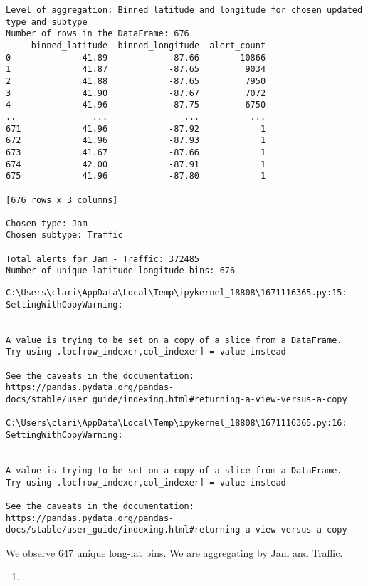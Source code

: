 \documentclass[
  letterpaper,
  DIV=11,
  numbers=noendperiod]{scrartcl}
\providecommand{\tightlist}{%
  \setlength{\itemsep}{0pt}\setlength{\parskip}{0pt}}\usepackage{longtable,booktabs,array}
\begin{document}
\begin{verbatim}
Level of aggregation: Binned latitude and longitude for chosen updated type and subtype
Number of rows in the DataFrame: 676
     binned_latitude  binned_longitude  alert_count
0              41.89            -87.66        10866
1              41.87            -87.65         9034
2              41.88            -87.65         7950
3              41.90            -87.67         7072
4              41.96            -87.75         6750
..               ...               ...          ...
671            41.96            -87.92            1
672            41.96            -87.93            1
673            41.67            -87.66            1
674            42.00            -87.91            1
675            41.96            -87.80            1

[676 rows x 3 columns]

Chosen type: Jam
Chosen subtype: Traffic

Total alerts for Jam - Traffic: 372485
Number of unique latitude-longitude bins: 676
\end{verbatim}

\begin{verbatim}
C:\Users\clari\AppData\Local\Temp\ipykernel_18808\1671116365.py:15: SettingWithCopyWarning:


A value is trying to be set on a copy of a slice from a DataFrame.
Try using .loc[row_indexer,col_indexer] = value instead

See the caveats in the documentation: https://pandas.pydata.org/pandas-docs/stable/user_guide/indexing.html#returning-a-view-versus-a-copy

C:\Users\clari\AppData\Local\Temp\ipykernel_18808\1671116365.py:16: SettingWithCopyWarning:


A value is trying to be set on a copy of a slice from a DataFrame.
Try using .loc[row_indexer,col_indexer] = value instead

See the caveats in the documentation: https://pandas.pydata.org/pandas-docs/stable/user_guide/indexing.html#returning-a-view-versus-a-copy
\end{verbatim}

We observe 647 unique long-lat bins. We are aggregating by Jam and
Traffic.

\begin{enumerate}
\def\labelenumi{\arabic{enumi}.}
\setcounter{enumi}{1}
\tightlist
\item
\end{enumerate}
\end{document}
